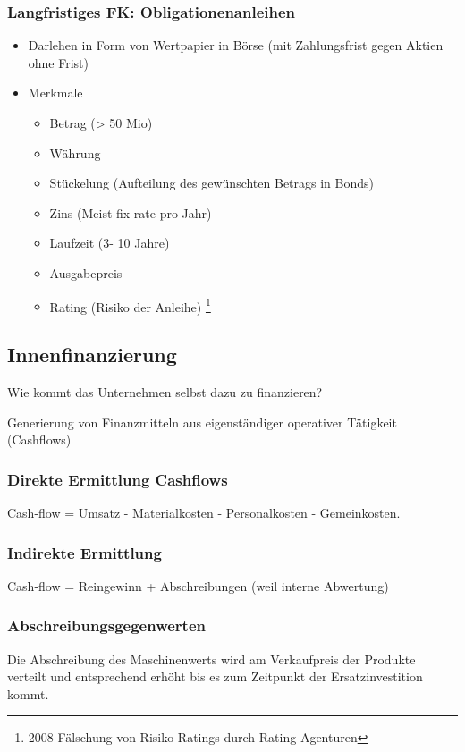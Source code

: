 \subsubsection{Langfristiges FK: Obligationenanleihen}
\begin{itemize}
    \item Darlehen in Form von Wertpapier in Börse (mit Zahlungsfrist gegen Aktien ohne Frist)
    \item Merkmale
    \begin{itemize}
        \item Betrag (> 50 Mio)
        \item Währung
        \item Stückelung (Aufteilung des gewünschten Betrags in Bonds)
        \item Zins (Meist fix rate pro Jahr)
        \item Laufzeit (3- 10 Jahre)
        \item Ausgabepreis
        \item Rating (Risiko der Anleihe) \footnote{2008 Fälschung von Risiko-Ratings durch Rating-Agenturen}
    \end{itemize}
\end{itemize}
\subsection{Innenfinanzierung}
Wie kommt das Unternehmen selbst dazu zu finanzieren?
\begin{definition}
    [Innenfinanzierung] Generierung von Finanzmitteln aus eigenständiger operativer Tätigkeit (Cashflows)
\end{definition}
\subsubsection{Direkte Ermittlung Cashflows}
Cash-flow = Umsatz - Materialkosten - Personalkosten - Gemeinkosten.

\subsubsection{Indirekte Ermittlung}
Cash-flow  = Reingewinn + Abschreibungen (weil interne Abwertung)

\subsubsection{Abschreibungsgegenwerten}
Die Abschreibung des Maschinenwerts wird am Verkaufpreis der Produkte verteilt und entsprechend erhöht bis es zum Zeitpunkt der Ersatzinvestition kommt.

